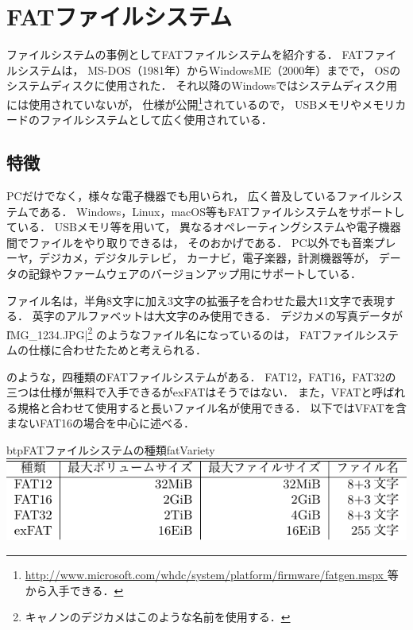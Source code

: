 \chapter{FATファイルシステム}
ファイルシステムの事例としてFATファイルシステムを紹介する．
FATファイルシステムは，
MS-DOS（1981年）からWindowsME（2000年）までで，
OSのシステムディスクに使用された．
それ以降のWindowsではシステムディスク用には使用されていないが，
仕様が公開\footnote{
  \url{http://www.microsoft.com/whdc/system/platform/firmware/fatgen.mspx
  }等から入手できる．}されているので，
USBメモリやメモリカードのファイルシステムとして広く使用されている．

\section{特徴}
PCだけでなく，様々な電子機器でも用いられ，
広く普及しているファイルシステムである．
Windows，Linux，macOS等もFATファイルシステムをサポートしている．
USBメモリ等を用いて，
異なるオペレーティングシステムや電子機器間でファイルをやり取りできるは，
そのおかげである．
PC以外でも音楽プレーヤ，デジカメ，デジタルテレビ，
カーナビ，電子楽器，計測機器等が，
データの記録やファームウェアのバージョンアップ用にサポートしている．

ファイル名は，半角8文字に加え3文字の拡張子を合わせた最大11文字で表現する．
英字のアルファベットは大文字のみ使用できる．
デジカメの写真データが\|IMG_1234.JPG|\footnote{
  キャノンのデジカメはこのような名前を使用する．}
のようなファイル名になっているのは，
FATファイルシステムの仕様に合わせたためと考えられる．

のような，四種類のFATファイルシステムがある．
FAT12，FAT16，FAT32の三つは仕様が無料で入手できるがexFATはそうではない．
また，VFATと呼ばれる規格と合わせて使用すると長いファイル名が使用できる．
以下ではVFATを含まないFAT16の場合を中心に述べる．

\begin{mytable}{btp}{FATファイルシステムの種類}{fatVariety}
  \includegraphics[scale=1.0]{Tbl/fatVariety.pdf}
\end{mytable}

